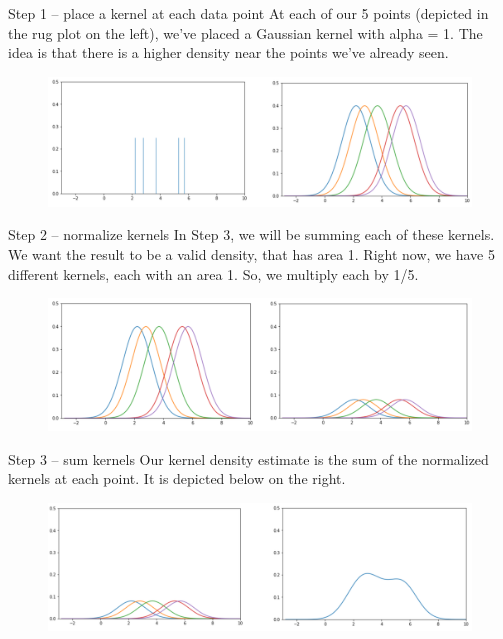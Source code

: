 \documentclass[aspectratio=169]{../latex_main/tntbeamer}  %
\begin{document}
	
	\begin{frame}{Step 1 – place a kernel at each data point}
	    At each of our 5 points (depicted in the rug plot on the left), we’ve placed a Gaussian kernel with alpha = 1. The idea is that there is a higher density near the points we’ve already seen.
	    \begin{figure}
	        \centering
	        \includegraphics[scale=.4]{Bild85}
	    \end{figure}
	\end{frame}
	
	
	\begin{frame}{Step 2 – normalize kernels}
	    In Step 3, we will be summing each of these kernels. We want the result to be a valid density, that has area 1. Right now, we have 5 different kernels, each with an area 1. So, we multiply each by 1/5.
	    \begin{figure}
	        \centering
	        \includegraphics[scale=.4]{Bild86}
	    \end{figure}
	\end{frame}
	
	
	\begin{frame}{Step 3 – sum kernels}
	    Our kernel density estimate is the sum of the normalized kernels at each point. It is depicted below on the right.
	    \begin{figure}
	        \centering
	        \includegraphics[scale=.4]{Bild87}
	    \end{figure}
	\end{frame}
	
\end{document}
